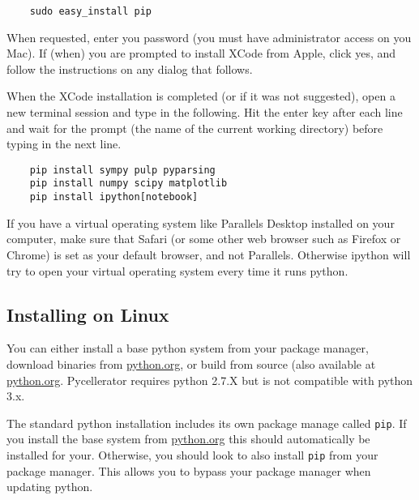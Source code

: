 \begin{verbatim}
    sudo easy_install pip
\end{verbatim}

When requested, enter you password (you must have administrator access on you Mac). If (when) you are prompted to install XCode from Apple, click yes, and follow the instructions on any dialog that follows. 

When the XCode installation is completed (or if it was not suggested), open a new terminal session and type in the following. Hit the enter key after each line and wait for the prompt (the name of the current working directory) before typing in the next line. 

\begin{verbatim}
    pip install sympy pulp pyparsing
    pip install numpy scipy matplotlib
    pip install ipython[notebook]
\end{verbatim}

If you have a virtual operating system like Parallels Desktop installed on your computer, make sure that Safari (or some other web browser such as Firefox or Chrome) is set as your default browser, and not Parallels. Otherwise ipython will try to open your virtual operating system every time it runs python. 


\subsection{Installing on Linux}

You can either install a base python system from your package manager, download binaries from \href{python.org}{python.org}, or build from source (also available at \href{python.org}{python.org}. Pycellerator requires python 2.7.X but is not compatible with python 3.x. 

The standard python installation includes its own package manage called {\tt pip}. If you install the base system from 
\href{python.org}{python.org} this should automatically be installed for your. Otherwise, you should look to also install {\tt pip} from your package manager. This allows you to bypass your package manager when updating python.

